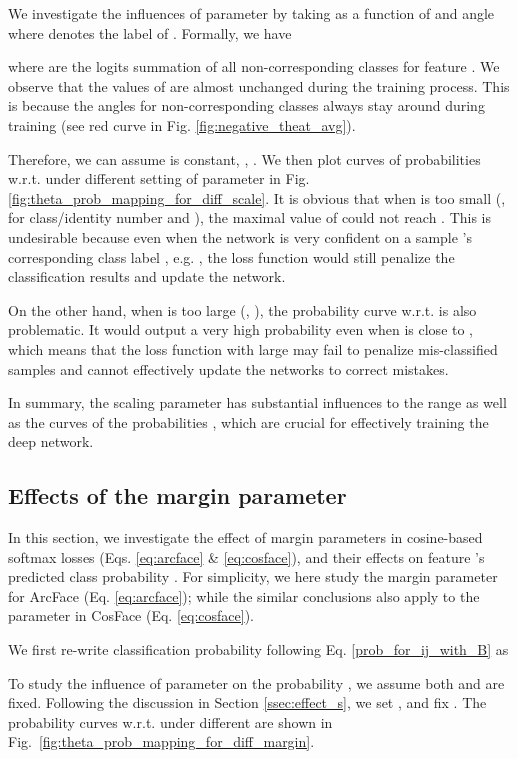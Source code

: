 \documentclass[10pt,twocolumn,letterpaper]{article}
\begin{document}
We investigate the influences of parameter  by taking  as a function of  and angle  where  denotes the label of . Formally, we have 

where  are the logits summation of all non-corresponding classes for feature . We observe that the values of  are almost unchanged during the training process. This is because the angles  for non-corresponding classes  always stay around  during training (see red curve in Fig. \ref{fig:negative_theat_avg}). 

Therefore, we can assume  is constant, \ie,  . We then plot curves of probabilities  w.r.t.  under different setting of parameter  in Fig. \ref{fig:theta_prob_mapping_for_diff_scale}. It is obvious that when  is too small (\eg,  for class/identity number  and ), the maximal value of  could not reach . This is undesirable because even when the network is very confident on a sample 's corresponding class label , e.g. , the loss function would still penalize the classification results and update the network. 

On the other hand, when  is too large (\eg, ), the probability curve  w.r.t.  is also problematic. It would output a very high probability even when  is close to , which means that the loss function with large  may fail to penalize mis-classified samples and cannot effectively update the networks to correct mistakes.

In summary, the scaling parameter  has substantial influences to the range as well as the curves of the probabilities , which are crucial for effectively training the deep network.

\subsection{Effects of the margin parameter }
\label{ssec:effect_m}
In this section, we investigate the effect of margin parameters  in cosine-based softmax losses (Eqs. \eqref{eq:arcface} \& \eqref{eq:cosface}), and their effects on feature 's predicted class probability . For simplicity, we here study the margin parameter  for ArcFace (Eq. \ref{eq:arcface}); while the similar conclusions also apply to the parameter  in CosFace (Eq. \eqref{eq:cosface}).

We first re-write classification probability  following Eq. \eqref{prob_for_ij_with_B} as

To study the influence of parameter  on the probability , we assume both  and  are fixed. Following the discussion in Section \ref{ssec:effect_s}, we set , and fix . The probability curves  w.r.t.  under different  are shown in Fig.~\ref{fig:theta_prob_mapping_for_diff_margin}.
\end{document}
